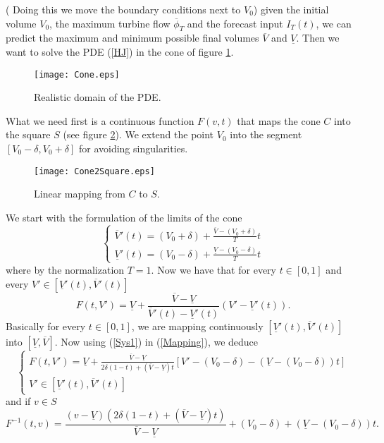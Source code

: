 \documentclass[12pt]{article}
\theoremstyle{definition}
\theoremstyle{remark}
\begin{document}
({\color[rgb]{1,0,0} Doing this we move the boundary conditions next to $V_0$}) given the initial volume $V_0$, the maximum turbine flow $\overline{\phi}_T$ and the forecast input $I_T(t)$, we can predict the maximum and minimum possible final volumes $\overline{V}$ and $\underline{V}$. Then we want to solve the PDE (\ref{HJ}) in the cone of figure \ref{Cone}.
\begin{figure}[ht!]
\centering
\texttt{[image: Cone.eps]}
\caption{Realistic domain of the PDE.}
\label{Cone}
\end{figure}
What we need first is a continuous function $F(v,t)$ that maps the cone $C$ into the square $S$ (see figure \ref{Cone2Square}). We extend the point $V_0$ into the segment $[V_0-\delta,V_0+\delta]$ for avoiding singularities.
\begin{figure}[ht!]
\centering
\texttt{[image: Cone2Square.eps]}
\caption{Linear mapping from $C$ to $S$.}
\label{Cone2Square}
\end{figure}
We start with the formulation of the limits of the cone
\begin{equation}
\begin{cases}
\overline{V}'(t)=(V_0+\delta)+\frac{\overline{V}-(V_0+\delta)}{T}t\\
\underline{V}'(t)=(V_0-\delta)+\frac{\underline{V}-(V_0-\delta)}{T}t
\end{cases}
\label{Sys1}
\end{equation}
where by the normalization $T=1$. Now we have that for every $t\in[0,1]$ and every $V'\in[\underline{V}'(t),\overline{V}'(t)]$
\begin{equation}
F(t,V')=\underline{V}+\frac{\overline{V}-\underline{V}}{\overline{V}'(t)-\underline{V}'(t)}(V'-\underline{V}'(t)).
\label{Mapping}
\end{equation}
Basically for every $t\in[0,1]$, we are mapping continuously $[\underline{V}'(t),\overline{V}'(t)]$ into $[\underline{V},\overline{V}]$. Now using (\ref{Sys1}) in (\ref{Mapping}), we deduce
\begin{equation}
\begin{cases}
F(t,V')=\underline{V}+\frac{\overline{V}-\underline{V}}{2\delta(1-t)+(\overline{V}-\underline{V})t}[V'-(V_0-\delta)-(\underline{V}-(V_0-\delta))t]\\
V'\in[\underline{V}'(t),\overline{V}'(t)]
\end{cases}
\label{C2S}
\end{equation}
and if $v\in S$
\begin{equation}
F^{-1}(t,v)=\frac{(v-\underline{V})(2\delta(1-t)+(\overline{V}-\underline{V})t)}{\overline{V}-\underline{V}}+(V_0-\delta)+(\underline{V}-(V_0-\delta))t.
\label{S2C}
\end{equation}
\end{document}
